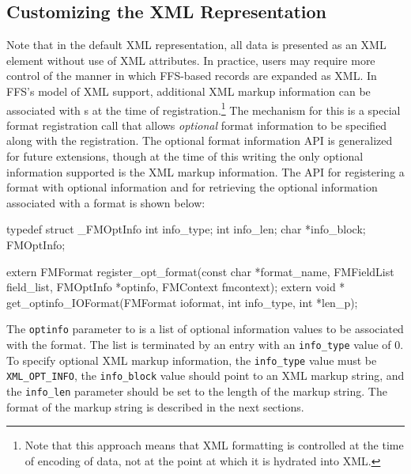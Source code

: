 \subsection{Customizing the XML Representation}
Note that in the default XML representation, all data is presented as an XML
element without use of XML attributes.  In practice, users may require more
control of the manner in which FFS-based records are expanded as XML.
In FFS's model of XML support, additional XML markup information can be
associated with s at the time of
registration.\footnote{Note that this approach means that XML formatting is
controlled at the time of encoding of data, not at the point at which it is
hydrated into XML.}  The mechanism for this is a special format registration
call that allows {\it optional} format information to be specified along
with the registration.  The optional format information API is generalized
for future extensions, though at the time of this writing the only optional
information supported is the XML markup information.  The API for registering a format with
optional information and for retrieving the optional information associated
with a format is shown below:
\begin{Code}
typedef struct _FMOptInfo {
    int info_type;
    int info_len;
    char *info_block;
} FMOptInfo;

extern FMFormat register_opt_format(const char *format_name, FMFieldList field_list,
				    FMOptInfo *optinfo, FMContext fmcontext);
extern void * get_optinfo_IOFormat(FMFormat ioformat, int info_type, int *len_p);
\end{Code}
The {\tt optinfo} parameter to  is a list
of optional information values to be associated with the format.  The list
is terminated by an entry with an {\tt info\_type} value of 0.  To specify
optional XML markup information, the {\tt info\_type} value must be {\tt
XML\_OPT\_INFO}, the {\tt info\_block} value should point to an XML markup
string, and the {\tt info\_len} parameter should be set to the length of the
markup string.  The format of the markup string is described in the next
sections.


